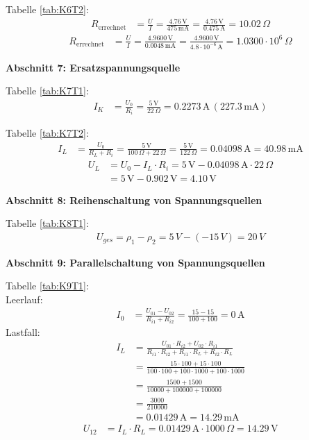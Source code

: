 Tabelle \ref{tab:K6T2}:
\begin{align*}
    R_{\text{errechnet}} &= \frac{U}{I} = \frac{4.76 \, \mathrm{V}}{475 \, \mathrm{mA}} = \frac{4.76 \, \mathrm{V}}{0.475 \, \mathrm{A}} = 10.02 \, \Omega
\end{align*}
\begin{align*}
    R_{\text{errechnet}} &= \frac{U}{I} = \frac{4.9600 \, \mathrm{V}}{0.0048 \, \mathrm{mA}} = \frac{4.9600 \, \mathrm{V}}{4.8 \cdot 10^{-6} \, \mathrm{A}} = 1.0300 \cdot 10^6 \, \Omega
\end{align*}

\large \textbf{Abschnitt 7: Ersatzspannungsquelle}

Tabelle \ref{tab:K7T1}:
\begin{align*}
    I_K &= \frac{U_0}{R_i} = \frac{5 \, \mathrm{V}}{22 \, \Omega} = 0.2273 \, \mathrm{A} \, (227.3 \, \mathrm{mA})
\end{align*}

Tabelle \ref{tab:K7T2}:
\begin{align*}
    I_L &= \frac{U_0}{R_L + R_i} = \frac{5 \, \mathrm{V}}{100 \, \Omega + 22 \, \Omega} = \frac{5 \, \mathrm{V}}{122 \, \Omega} = 0.04098 \, \mathrm{A} = 40.98 \, \mathrm{mA}
\end{align*}
\begin{align*}
    U_L &= U_0 - I_L \cdot R_i = 5 \, \mathrm{V} - 0.04098 \, \mathrm{A} \cdot 22 \, \Omega \\
    &= 5 \, \mathrm{V} - 0.902 \, \mathrm{V} = 4.10 \, \mathrm{V}
\end{align*}

\large \textbf{Abschnitt 8: Reihenschaltung von Spannungsquellen}

Tabelle \ref{tab:K8T1}:
\begin{align*}
    U_{ges}=\rho_1-\rho_2=5\,\unit{V}-(-15\,\unit{V})=20\,\unit{V}
\end{align*}

\large \textbf{Abschnitt 9: Parallelschaltung von Spannungsquellen}

Tabelle \ref{tab:K9T1}:\\
Leerlauf:
\begin{align*}
    I_0 &= \frac{U_{01} - U_{02}}{R_{i1} + R_{i2}} = \frac{15 - 15}{100 + 100} = 0 \, \mathrm{A}
\end{align*}
Lastfall:
\begin{align*}
    I_L &= \frac{U_{01} \cdot R_{i2} + U_{02} \cdot R_{i1}}{R_{i1} \cdot R_{i2} + R_{i1} \cdot R_L + R_{i2} \cdot R_L} \\
    &= \frac{15 \cdot 100 + 15 \cdot 100}{100 \cdot 100 + 100 \cdot 1000 + 100 \cdot 1000} \\
    &= \frac{1500 + 1500}{10000 + 100000 + 100000} \\
    &= \frac{3000}{210000} \\
    &= 0.01429 \, \mathrm{A} = 14.29 \, \mathrm{mA}
\end{align*}
\begin{align*}
    U_{12} &= I_L \cdot R_L= 0.01429 \, \mathrm{A} \cdot 1000 \, \Omega = 14.29 \, \mathrm{V}
\end{align*}

